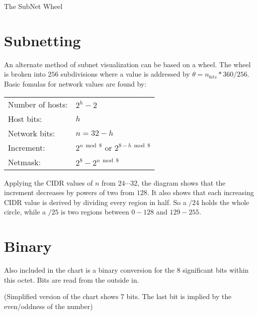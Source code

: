 \documentclass[10pt]{article}
\begin{document}
\thispagestyle{empty}
\begin{center}
  {\Large The SubNet Wheel}\\
\end{center}

\section{Subnetting}

An alternate method of subnet visualization can be based on a wheel. The wheel
is broken into $256$ subdivisions where a value is addressed by
$\theta=n_{bits}*360/256$. Basic fomulas for network values are found by:

\begin{tabular}{ll}
Number of hosts: 	& $2^h-2$\\
Host bits: 		& $h$\\
Network bits: 		& $n=32-h$\\
Increment: 		& $2^{n \bmod 8}$ or $2^{8-h \bmod 8}$\\
Netmask: 		& $2^8-2^{n \bmod 8}$\\
\end{tabular}

Applying the CIDR values of $n$ from $24\cdots32$, the diagram shows that the
increment decreases by powers of two from $128$. It also shows that each
increasing CIDR value is derived by dividing every region in half. So a $/24$
holds the whole circle, while a $/25$ is two regions between $0-128$ and
$129-255$.

\section{Binary}

Also included in the chart is a binary conversion for the 8 significant bits
within this octet. Bits are read from the outside in.

(Simplified version of the chart shows 7 bits. The last bit is implied by the
even/oddness of the number)
\end{document}
